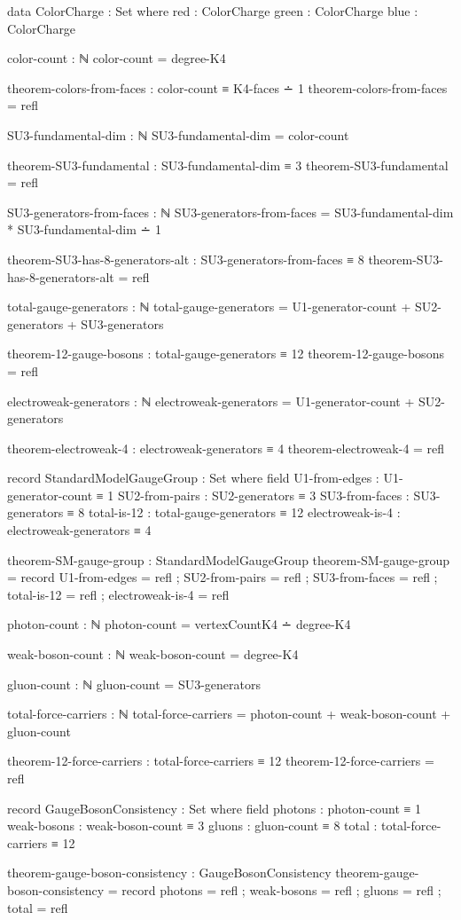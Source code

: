 \documentclass[11pt,a4paper]{book}
\begin{document}
\begin{code}
data ColorCharge : Set where
  red   : ColorCharge
  green : ColorCharge
  blue  : ColorCharge

color-count : ℕ
color-count = degree-K4

theorem-colors-from-faces : color-count ≡ K4-faces ∸ 1
theorem-colors-from-faces = refl

SU3-fundamental-dim : ℕ
SU3-fundamental-dim = color-count

theorem-SU3-fundamental : SU3-fundamental-dim ≡ 3
theorem-SU3-fundamental = refl

SU3-generators-from-faces : ℕ
SU3-generators-from-faces = SU3-fundamental-dim * SU3-fundamental-dim ∸ 1

theorem-SU3-has-8-generators-alt : SU3-generators-from-faces ≡ 8
theorem-SU3-has-8-generators-alt = refl
\end{code}

\begin{code}
total-gauge-generators : ℕ
total-gauge-generators = U1-generator-count + SU2-generators + SU3-generators

theorem-12-gauge-bosons : total-gauge-generators ≡ 12
theorem-12-gauge-bosons = refl

electroweak-generators : ℕ
electroweak-generators = U1-generator-count + SU2-generators

theorem-electroweak-4 : electroweak-generators ≡ 4
theorem-electroweak-4 = refl

record StandardModelGaugeGroup : Set where
  field
    U1-from-edges    : U1-generator-count ≡ 1
    SU2-from-pairs   : SU2-generators ≡ 3
    SU3-from-faces   : SU3-generators ≡ 8
    total-is-12      : total-gauge-generators ≡ 12
    electroweak-is-4 : electroweak-generators ≡ 4

theorem-SM-gauge-group : StandardModelGaugeGroup
theorem-SM-gauge-group = record
  { U1-from-edges    = refl
  ; SU2-from-pairs   = refl
  ; SU3-from-faces   = refl
  ; total-is-12      = refl
  ; electroweak-is-4 = refl
  }
\end{code}

\begin{code}
photon-count : ℕ
photon-count = vertexCountK4 ∸ degree-K4

weak-boson-count : ℕ
weak-boson-count = degree-K4

gluon-count : ℕ
gluon-count = SU3-generators

total-force-carriers : ℕ
total-force-carriers = photon-count + weak-boson-count + gluon-count

theorem-12-force-carriers : total-force-carriers ≡ 12
theorem-12-force-carriers = refl

record GaugeBosonConsistency : Set where
  field
    photons     : photon-count ≡ 1
    weak-bosons : weak-boson-count ≡ 3
    gluons      : gluon-count ≡ 8
    total       : total-force-carriers ≡ 12

theorem-gauge-boson-consistency : GaugeBosonConsistency
theorem-gauge-boson-consistency = record
  { photons     = refl
  ; weak-bosons = refl
  ; gluons      = refl
  ; total       = refl
  }
\end{code}
\end{document}
